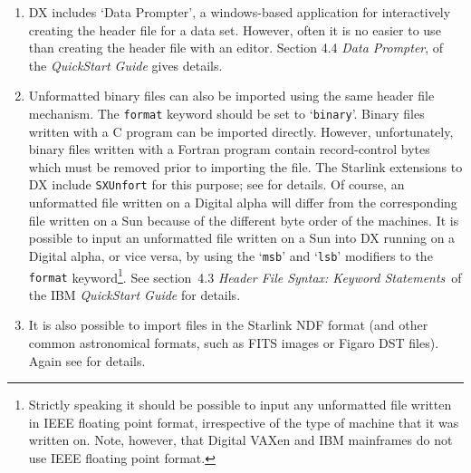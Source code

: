 \begin{enumerate}

  \item DX includes `Data Prompter', a windows-based application for
   interactively creating the header file for a data set. However, often
   it is no easier to use than creating the header file with an editor.
   Section 4.4 {\it Data Prompter}, of the {\it QuickStart
   Guide}\cite{QUICKS} gives details.

  \newpage
  \item Unformatted binary files can also be imported using the same
   header file mechanism. The {\tt format} keyword should be set to
   `{\tt binary}'. Binary files written with a C program can be
   imported directly. However, unfortunately, binary files  written with
   a Fortran program contain record-control bytes which must be
   removed prior to importing the file. The Starlink extensions to DX
   include {\tt SXUnfort} for this purpose; see
   \cite{SUN203} for details. Of course, an
   unformatted file written on a Digital alpha will differ from the
   corresponding file written on a Sun because of the different byte
   order of the machines. It is possible to input an unformatted file
   written on a Sun into DX running on a Digital alpha, or vice versa, by
   using the `{\tt msb}' and `{\tt lsb}' modifiers to the {\tt format}
   keyword\footnote{Strictly speaking it should be possible to input any
   unformatted file written in IEEE floating point format, irrespective
   of the type of machine that it was written on. Note, however, that
   Digital VAXen and IBM mainframes do not use IEEE floating point format.}.
   See section~4.3 {\it Header File Syntax: Keyword Statements}\, of the
   IBM {\it QuickStart Guide}\cite{QUICKS} for details.

  \item It is also possible to import files in the Starlink NDF format
   (and other common astronomical formats, such as FITS images or Figaro
   DST files). Again see \cite{SUN203} for details.

\end{enumerate}

